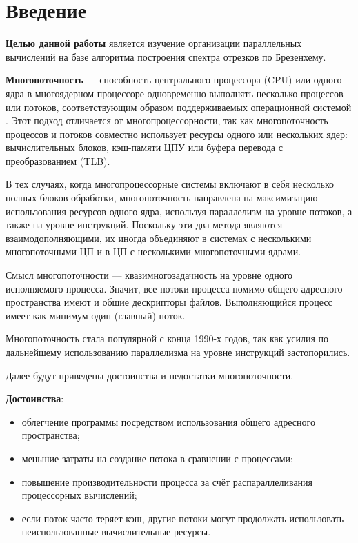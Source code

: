 \chapter*{Введение}

\textbf{Целью данной работы} является изучение организации параллельных вычислений на базе алгоритма построения спектра отрезков по Брезенхему.

\textbf{Многопоточность} — способность центрального процессора (CPU) или одного ядра в многоядерном процессоре одновременно выполнять несколько процессов или потоков, соответствующим образом поддерживаемых операционной системой \cite{multithread}.
Этот подход отличается от многопроцессорности, так как многопоточность процессов и потоков совместно использует ресурсы одного или нескольких ядер: вычислительных блоков, кэш-памяти ЦПУ или буфера перевода с преобразованием (TLB).

В тех случаях, когда многопроцессорные системы включают в себя несколько полных блоков обработки, многопоточность направлена на максимизацию использования ресурсов одного ядра, используя параллелизм на уровне потоков, а также на уровне инструкций.
Поскольку эти два метода являются взаимодополняющими, их иногда объединяют в системах с несколькими многопоточными ЦП и в ЦП с несколькими многопоточными ядрами.

Смысл многопоточности — квазимногозадачность на уровне одного исполняемого процесса.
Значит, все потоки процесса помимо общего адресного пространства имеют и общие дескрипторы файлов. Выполняющийся процесс имеет как минимум один (главный) поток.

Многопоточность стала популярной с конца 1990-х годов, так как усилия по дальнейшему использованию параллелизма на уровне инструкций застопорились.

Далее будут приведены достоинства и недостатки многопоточности.

\textbf{Достоинства}:
\begin{itemize}
	\item облегчение программы посредством использования общего адресного пространства;
	\item меньшие затраты на создание потока в сравнении с процессами;
	\item повышение производительности процесса за счёт распараллеливания процессорных вычислений;
	\item если поток часто теряет кэш, другие потоки могут продолжать использовать неиспользованные вычислительные ресурсы.
\end{itemize}

